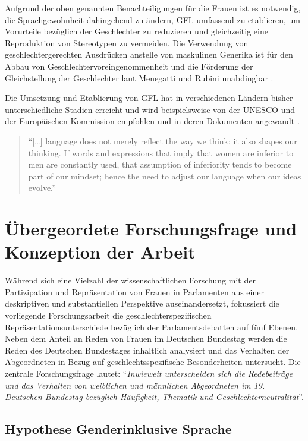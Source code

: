 \documentclass[12pt, 
    twoside=false, 
    bibliography=totoc, 
    numbers=endperiod, 
    headings=normal, 
    toc=chapterentrydotfill
    ]{scrbook}
\begin{document}
Aufgrund der oben genannten Benachteiligungen für die Frauen ist es notwendig, die Sprachgewohnheit dahingehend zu ändern, GFL umfassend zu etablieren, um Vorurteile bezüglich der Geschlechter zu reduzieren und gleichzeitig eine Reproduktion von Stereotypen zu vermeiden. Die Verwendung von geschlechtergerechten Ausdrücken anstelle von maskulinen Generika ist für den Abbau von Geschlechtervoreingenommenheit und die Förderung der Gleichstellung der Geschlechter laut Menegatti und Rubini unabdingbar \parencite*{menegatti_2017}.

Die Umsetzung und Etablierung von GFL hat in verschiedenen Ländern bisher unterschiedliche Stadien erreicht und wird beispielsweise von der UNESCO und der Europäischen Kommission empfohlen und in deren Dokumenten angewandt \parencite[4]{sczesny_2016}.

\begin{quote}
    \enquote{[…] language does not merely reflect the way we think: it also shapes our thinking. If words and expressions that imply that women are inferior to men are constantly used, that assumption of inferiority tends to become part of our mindset; hence the need to adjust our language when our ideas evolve.} \parencite {unesco_2011} 
\end{quote}

\chapter{Übergeordete Forschungsfrage und Konzeption der Arbeit}

Während sich eine Vielzahl der wissenschaftlichen Forschung mit der Partizipation und Repräsentation von Frauen in Parlamenten aus einer deskriptiven und substantiellen Perspektive auseinandersetzt, fokussiert die vorliegende Forschungsarbeit die geschlechterspezifischen Repräsentationsunterschiede bezüglich der Parlamentsdebatten auf fünf Ebenen.
Neben dem Anteil an Reden von Frauen im Deutschen Bundestag werden die Reden des Deutschen Bundestages inhaltlich analysiert und das Verhalten der Abgeordneten in Bezug auf geschlechtsspezifische Besonderheiten untersucht. Die zentrale Forschungsfrage lautet: \enquote{\emph{Inwieweit unterscheiden sich die Redebeiträge und das Verhalten von weiblichen und männlichen Abgeordneten im 19. Deutschen Bundestag bezüglich Häufigkeit, Thematik und Geschlechterneutralität}}.


\section{Hypothese Genderinklusive Sprache}
\end{document}
